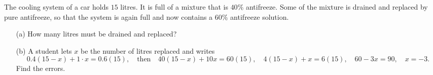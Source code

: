 The cooling system of a car holds $15$ litres. It is full of a mixture that is $40\%$ antifreeze. Some of the mixture is drained and replaced by pure antifreeze, so that the system is again full and now contains a $60\%$ antifreeze solution.
\begin{enumerate}
\item[(a)] How many litres must be drained and replaced?
\item[(b)] A student lets $x$ be the number of litres replaced and writes
\[0.4(15-x)+1\cdot x=0.6(15),\quad\text{then}\quad40(15-x)+10x=60(15),\quad4(15-x)+x=6(15),\quad60-3x=90,\quad x=-3 .\]
Find the errors.
\end{enumerate}
